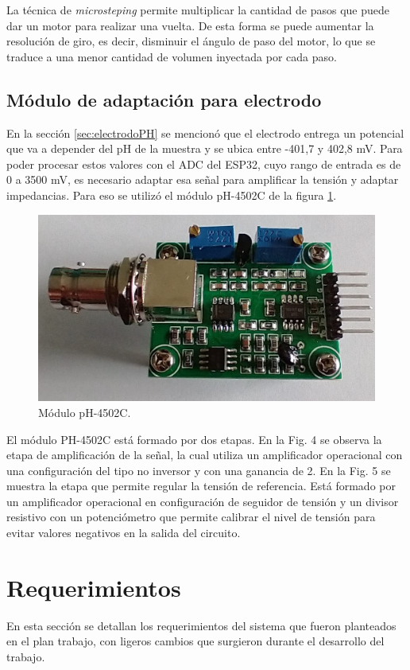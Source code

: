 La técnica de \textit{microsteping} permite multiplicar la cantidad de pasos que puede dar un motor para realizar una vuelta. De esta forma se puede aumentar la resolución de giro, es decir, disminuir el ángulo de paso del motor, lo que se traduce a una menor cantidad de volumen inyectada por cada paso.

\subsection{Módulo de adaptación para electrodo}

En la sección \ref{sec:electrodoPH} se mencionó que el electrodo entrega un potencial que va a depender del pH de la muestra y se ubica entre -401,7 y 402,8 mV. Para poder procesar estos valores con el ADC del ESP32, cuyo rango de entrada es de 0 a 3500 mV, es necesario adaptar esa señal para amplificar la tensión y adaptar impedancias. Para eso se utilizó el módulo pH-4502C de la figura \ref{fig:pH-4502C}.

\begin{figure}[htbp]
	\centering
	\includegraphics[width=.4\textwidth]{./Figures/pH-4502C.jpeg}
	\caption{Módulo pH-4502C.}
	\label{fig:pH-4502C}
\end{figure}

El módulo PH-4502C está formado por dos etapas. En la Fig. 4 se observa la etapa de amplificación de la señal, la cual utiliza un amplificador operacional con una configuración del tipo no inversor y con una ganancia de 2. En la Fig. 5 se muestra la etapa que permite regular la tensión de referencia. Está formado por un amplificador operacional en configuración de seguidor de tensión y un divisor resistivo con un potenciómetro que permite calibrar el nivel de tensión para evitar valores negativos en la salida del circuito.

\section{Requerimientos}
\label{sec:requerimientos}

En esta sección se detallan los requerimientos del sistema que fueron planteados en el plan trabajo, con ligeros cambios que surgieron durante el desarrollo del trabajo.


